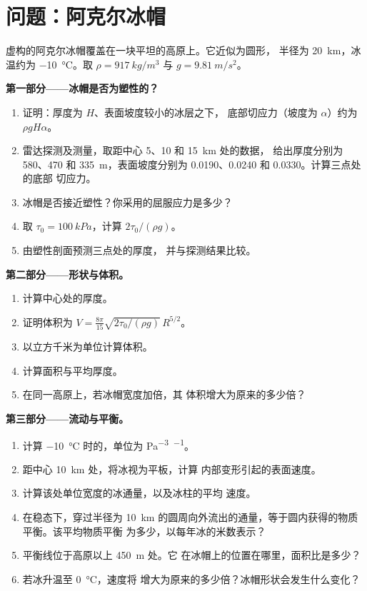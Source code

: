 \section{问题：阿克尔冰帽}

\begin{problem}
\label{pb:b3:glaciology:1}
虚构的阿克尔冰帽覆盖在一块平坦的高原上。它近似为圆形，
半径为 \qty{20}{km}，冰温约为 \qty{-10}{\celsius}。取
$\rho = \qty{917}{kg/m^3}$ 与 $g = \qty{9.81}{m/s^2}$。

\medskip\noindent\textbf{第一部分——冰帽是否为塑性的？}
\begin{enumerate}
\item 证明：厚度为 $H$、表面坡度较小的冰层之下，
  底部切应力（坡度为 $\alpha$）约为 $\rho gH\alpha$。
\item 雷达探测及测量，取距中心 5、10 和 \qty{15}{km} 处的数据，
  给出厚度分别为 580、470 和 \qty{335}{m}，表面坡度分别为
  \num{0.0190}、\num{0.0240} 和 \num{0.0330}。计算三点处的底部
  切应力。
\item 冰帽是否接近塑性？你采用的屈服应力是多少？
\item 取 $\tau_0 = \qty{100}{kPa}$，计算 $2\tau_0/(\rho g)$。
\item 由塑性剖面预测三点处的厚度，
  并与探测结果比较。
\end{enumerate}

\medskip\noindent\textbf{第二部分——形状与体积。}
\begin{enumerate}[resume]
\item 计算中心处的厚度。
\item 证明体积为 $V = \frac{8\pi}{15}\sqrt{2\tau_0/(\rho
  g)}\,R^{5/2}$。
\item 以立方千米为单位计算体积。
\item 计算面积与平均厚度。
\item 在同一高原上，若冰帽宽度加倍，其
  体积增大为原来的多少倍？
\end{enumerate}

\medskip\noindent\textbf{第三部分——流动与平衡。}
\begin{enumerate}[resume]
\item 计算 \qty{-10}{\celsius} 时的，单位为
  \unit{Pa^{-3}.^{-1}}。
\item 距中心 \qty{10}{km} 处，将冰视为平板，计算
  内部变形引起的表面速度。
\item 计算该处单位宽度的冰通量，以及冰柱的平均
  速度。
\item 在稳态下，穿过半径为
  \qty{10}{km} 的圆周向外流出的通量，等于圆内获得的物质平衡。该平均物质平衡
  为多少，以每年冰的米数表示？
\item 平衡线位于高原以上 \qty{450}{m} 处。它
  在冰帽上的位置在哪里，面积比是多少？
\item 若冰升温至 \qty{0}{\celsius}，速度将
  增大为原来的多少倍？冰帽形状会发生什么变化？
\end{enumerate}


\end{problem}
